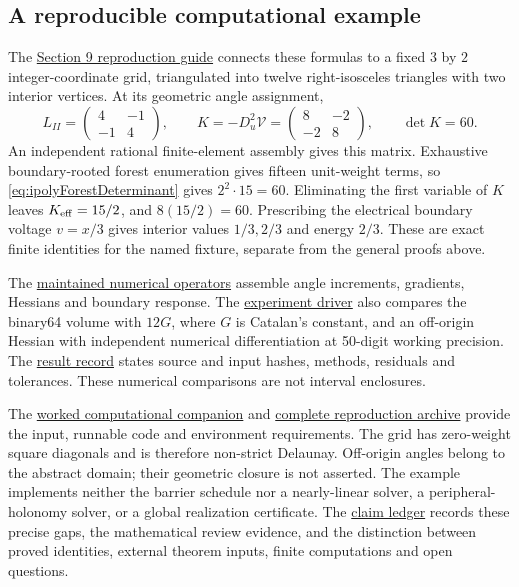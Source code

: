 \subsection{A reproducible computational example}
\label{subsec:ipolyComputation}

The \href{../experiments/section9/README.md}{Section 9 reproduction guide}
connects these formulas to a fixed $3$ by $2$ integer-coordinate grid,
triangulated into twelve right-isosceles triangles with two interior
vertices. At its geometric angle assignment,
\[
 L_{II}=\begin{pmatrix}4&-1\\-1&4\end{pmatrix},\qquad
 K=-D_u^2\mathcal V=\begin{pmatrix}8&-2\\-2&8\end{pmatrix},\qquad
 \det K=60.
\]
An independent rational finite-element assembly gives this matrix.
Exhaustive boundary-rooted forest enumeration gives fifteen unit-weight
terms, so \eqref{eq:ipolyForestDeterminant} gives $2^2\cdot15=60$.
Eliminating the first variable of $K$ leaves $K_{\rm eff}=15/2$, and
$8(15/2)=60$. Prescribing the electrical boundary voltage $v=x/3$
gives interior values $1/3,2/3$ and energy $2/3$. These are exact finite
identities for the named fixture, separate from the general proofs above.

The \href{../packages/volume-toolkit/ideal_poly_volume_toolkit/variational.py}
{maintained numerical operators} assemble angle increments, gradients,
Hessians and boundary response. The
\href{../experiments/section9/run.py}{experiment driver} also compares
the binary64 volume with $12G$, where $G$ is Catalan's constant, and an
off-origin Hessian with independent numerical differentiation at 50-digit
working precision. The \href{../artifacts/section9/result.json}{result record}
states source and input hashes, methods, residuals and tolerances.
These numerical comparisons are not interval enclosures.

The \href{../site/section9/index.html}{worked computational companion}
and \href{../site/section9/downloads/section9-reproduction.zip}{complete
reproduction archive} provide the input, runnable code and environment
requirements. The grid has zero-weight square diagonals and is therefore
non-strict Delaunay. Off-origin angles belong to the abstract domain;
their geometric closure is not asserted. The example implements neither
the barrier schedule nor a nearly-linear solver, a peripheral-holonomy
solver, or a global realization certificate. The
\href{claims/section9.json}{claim ledger} records these precise gaps,
the mathematical review evidence, and the distinction between proved
identities, external theorem inputs, finite computations and open questions.

